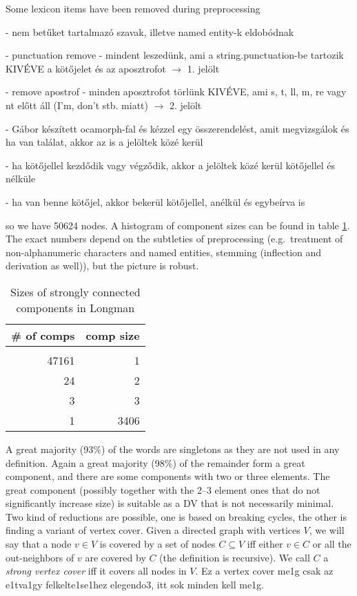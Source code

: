 \documentclass[a4paper,10pt]{article}
\begin{document}
Some lexicon items have been removed during preprocessing 
{\color{red}
- nem betűket tartalmazó szavak, illetve named entity-k eldobódnak

- punctuation remove - mindent leszedünk, ami a string.punctuation-be tartozik
KIVÉVE a kötőjelet és az aposztrofot $\rightarrow$ 1. jelölt

- remove apostrof - minden aposztrofot törlünk KIVÉVE, ami s, t, ll, m, re
vagy nt előtt áll (I'm, don't stb. miatt) $\rightarrow$ 2. jelölt

- Gábor készített ocamorph-fal és kézzel egy összerendelést, amit megvizsgálok
és ha van találat, akkor az is a jelöltek közé kerül

- ha kötőjellel kezdődik vagy végződik, akkor a jelöltek közé kerül kötőjellel
és nélküle

- ha van benne kötőjel, akkor bekerül kötőjellel, anélkül és egybeírva is
}

so we have 50624
nodes. A histogram of component sizes can be found in table
\ref{table_compon}. The exact numbers depend on the subtleties of
preprocessing (e.g.\ treatment of non-alphanumeric characters and named
entities, stemming (inflection and derivation as well)), but the picture is
robust.


\begin{table}
 \begin{center}
  \begin{tabular}{rr}
   \toprule
   \# of comps & comp size
   \\\midrule
   \\  47161	& 1
   \\  24	& 2
   \\  3	& 3
   \\  1        & 3406
   \\ \bottomrule
  \end{tabular}
  \caption{Sizes of strongly connected components in Longman}
  \label{table_compon}
 \end{center}
\end{table}

A great majority (93\%) of the words are singletons as they are not used in
any definition. Again a great majority (98\%) of the remainder form a great
component, and there are some components with two or three elements. The great
component (possibly together with the 2--3 element ones that do not
significantly increase size) is suitable as a DV that is not necessarily
minimal. Two kind of reductions are possible, one is based on breaking cycles,
the other is finding a variant of vertex cover. Given a directed graph with
vertices $V$, we will say that a node $v\in V$ is covered by a set of nodes
$C\subseteq V$ iff either $v\in C$ or all the out-neighbors of $v$ are covered
by $C$ (the definition is recursive). We call $C$ a \emph{strong vertex cover}
iff it covers all nodes in $V$. {\color{red} Ez a vertex cover me1g csak az
  e1tva1gy felkelte1se1hez elegendo3, itt sok minden kell me1g.}



\end{document}
